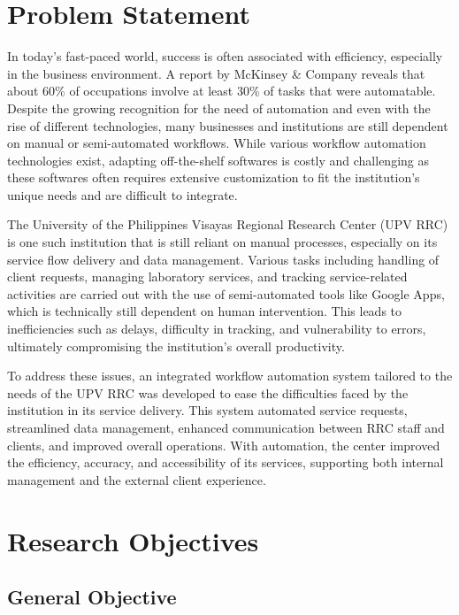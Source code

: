 \section{Problem Statement}

In today’s fast-paced world, success is often associated with efficiency, especially in the business environment. A report by McKinsey \& Company \cite{manyika2017} reveals that about 60\% of occupations involve at least 30\% of tasks that were automatable. Despite the growing recognition for the need of automation and even with the rise of different technologies, many businesses and institutions are still dependent on manual or semi-automated workflows. While various workflow automation technologies exist, adapting off-the-shelf softwares is costly and challenging as these softwares often requires extensive customization to fit the institution’s unique needs and are difficult to integrate. 

The University of the Philippines Visayas Regional Research Center (UPV RRC) is one such institution that is still reliant on manual processes, especially on its service flow delivery and data management. Various tasks including handling of client requests, managing laboratory services, and tracking service-related activities are carried out with the use of semi-automated tools like Google Apps, which is technically still dependent on human intervention. This leads to inefficiencies such as delays, difficulty in tracking, and vulnerability to errors, ultimately compromising the institution’s overall productivity.

To address these issues, an integrated workflow automation system tailored to the needs of the UPV RRC was developed to ease the difficulties faced by the institution in its service delivery. This system automated service requests, streamlined data management, enhanced communication between RRC staff and clients, and improved overall operations. With automation, the center improved the efficiency, accuracy, and accessibility of its services, supporting both internal management and the external client experience.

\section{Research Objectives}
\label{sec:researchobjectives}

\subsection{General Objective}
\label{sec:generalobjective}


